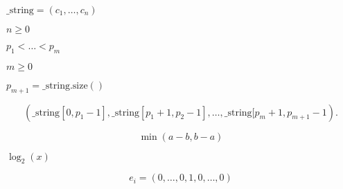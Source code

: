 \documentclass{article}
\begin{document}
$ \mathrm{\_string} = (c_1, \dots , c_n)$
\pagebreak

$ n \ge 0 $
\pagebreak

$ p_1 < \dots < p_m $
\pagebreak

$ m \ge 0 $
\pagebreak

$ p_{m+1} = \mathrm{\_string.size()}$
\pagebreak

\[
 (\mathrm{\_string}[0,p_1-1], \mathrm{\_string}[p_1+1,p_2-1], \dots,
\mathrm{\_string}[p_m+1,p_{m+1}-1). \]
\pagebreak

\[
\min(a - b, b - a)
\]
\pagebreak

$\log_2(x)$
\pagebreak

\[
e_i = (0,\ldots,0,1,0,\ldots,0)
\]
\pagebreak
\end{document}
